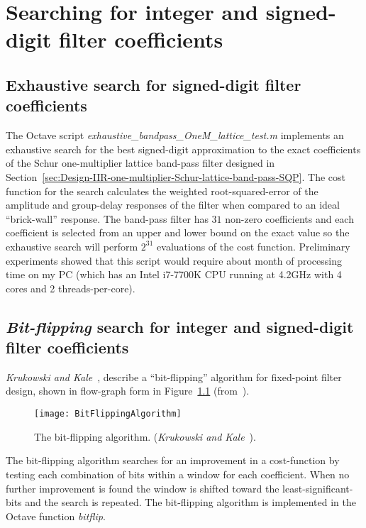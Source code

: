 \documentclass[a4paper,twoside,10pt,english]{report}
\begin{document}
\chapter{\label{sec:Searching-for-integer-signed-digit-filter-coefficients}Searching for integer and signed-digit filter coefficients}
\section{Exhaustive search for signed-digit filter coefficients}
The Octave script \emph{exhaustive\_bandpass\_OneM\_lattice\_test.m} implements
an exhaustive search for the best signed-digit approximation to the exact
coefficients of the Schur one-multiplier lattice band-pass filter designed in
Section~\ref{sec:Design-IIR-one-multiplier-Schur-lattice-band-pass-SQP}. The
cost function for the search calculates the weighted root-squared-error of
the amplitude and group-delay responses of the filter when compared to an ideal
``brick-wall'' response. The band-pass filter has $31$ non-zero coefficients and
each coefficient is selected from an upper and lower bound on the exact value so
the exhaustive search will perform $2^{31}$ evaluations of the cost function.
Preliminary experiments showed that this script would require about month of
processing time on my PC (which has an Intel i7-7700K CPU running at 4.2GHz 
with 4 cores and 2 threads-per-core). 
\section{\label{sec:bit-flip-search-integer-signed-digit-coefficients}\emph{Bit-flipping} search for integer and signed-digit filter coefficients}
\emph{Krukowski and 
Kale}~\cite{KrukowskiKale_FixedPointFilterDesignBitFlippingSimplex}, describe
a ``bit-flipping'' algorithm for fixed-point filter design, shown in flow-graph
form in Figure~\ref{fig:krukowski-kale-bit-flipping-algorithm}
(from~\cite[Figure 2]{KrukowskiKale_FixedPointFilterDesignBitFlippingSimplex}).

\begin{figure}[!htbp]
\begin{center}
\texttt{[image: BitFlippingAlgorithm]}
\caption{The bit-flipping algorithm. (\emph{Krukowski and Kale}~\cite[Figure 2]{KrukowskiKale_FixedPointFilterDesignBitFlippingSimplex}).}
\label{fig:krukowski-kale-bit-flipping-algorithm}
\end{center}
\end{figure}

The bit-flipping algorithm searches for an improvement in a cost-function by 
testing each combination of bits within a window for each coefficient. When no 
further improvement is found the window is shifted toward the
least-significant-bits and the search is repeated. The bit-flipping algorithm 
is implemented in the Octave function \emph{bitflip}. 
\end{document}
